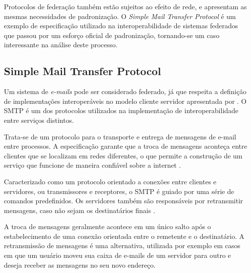 \begin{apendicesenv}
Protocolos de federação também estão sujeitos ao efeito de rede, e apresentam as
mesmas necessidades de padronização. O \textit{Simple Mail Transfer Protocol} é um
exemplo de especificação utilizado na interoperabilidade de sistemas federados que
passou por um esforço oficial de padronização, tornando-se um caso interessante na
análise deste processo.


\subsection{Simple Mail Transfer Protocol}

\begin{sloppypar}
Um sistema de \textit{e-mails} pode ser considerado federado, já que respeita a
definição de implementações interoperáveis no modelo cliente servidor apresentada
por \cite{barocas2012}. O SMTP é um dos protocolos utilizados na implementação de
interoperabilidade entre serviços distintos.
\end{sloppypar}

Trata-se de um protocolo para o transporte e entrega de mensagens de e-mail entre
processos. A especificação garante que a troca de mensagens aconteça entre clientes
que se localizam em redes diferentes, o que permite a construção de um serviço que
funcione de maneira confiável sobre a internet \cite{rfc2821}.

Caracterizado como um protocolo orientado a conexões entre clientes e servidores, ou
transmissores e receptores, o SMTP é guiado por uma série de comandos predefinidos.
Os servidores também são responsáveis por retransmitir mensagens, caso não sejam os
destinatários finais \cite{kurose2012}.

A troca de mensagens geralmente acontece em um único salto após o estabelecimento de
uma conexão orientada entre o remetente e o destinatário. A retransmissão de
mensagens é uma alternativa, utilizada por exemplo em casos em que um usuário moveu
sua caixa de e-mails de um servidor para outro e deseja receber as mensagens no seu
novo endereço.


\end{apendicesenv}
